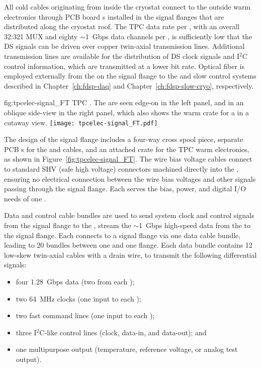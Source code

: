 All cold cables originating from inside the cryostat connect to the outside warm electronics through PCB board \fdth{}s
installed in the signal flanges that are distributed along the cryostat roof.
The TPC data rate per , with an overall \num{32}:\num{321} MUX and eighty $\sim$1~Gbps data channels per ,
is sufficiently low that the DS signals can be driven over copper twin-axial transmission lines.
Additional transmission lines are available for the distribution of DS clock signals and I$^2$C control information,
which are transmitted at a lower bit rate.
Optical fiber is employed externally from the  on the signal flange to the  and slow control systems described in Chapter~\ref{ch:fdsp-daq} and Chapter~\ref{ch:fdsp-slow-cryo}, respectively.

\begin{dunefigure}
{fig:tpcelec-signal_FT}
{TPC  \fdth. The  are seen edge-on in the left panel, and in an oblique side-view in the right panel, which also shows the warm crate for a  %
in a cutaway view.}
\texttt{[image: tpcelec-signal\_FT.pdf]}
\end{dunefigure}

The design of the signal flange includes a four-way cross spool piece, separate PCB \fdth{}s for the  and  cables, and
an attached crate for the TPC warm electronics, as shown in Figure~\ref{fig:tpcelec-signal_FT}.
The wire bias voltage cables connect to standard SHV (safe high voltage) connectors machined directly into the  \fdth,
ensuring no electrical connection between the wire bias voltages and other signals passing through the signal flange.
Each  \fdth serves the bias, power, and digital I/O needs of one .  

Data and control cable bundles are used to send system clock and control signals from the 
signal flange to the , stream the $\sim$\SI{1}{Gbps} high-speed data from the  to the signal flange.  Each  
connects to a signal flange via one data cable bundle, leading to 20 bundles between one  and one flange.  Each data bundle contains 12 low-skew twin-axial cables with a drain wire, 
to transmit the following differential signals:

\begin{itemize}
    \item four \SI{1.28}{Gbps} data (two from each );
    \item two \SI{64}{MHz} clocks (one input to each );
    \item two fast command lines (one input to each );
    \item three I$^2$C-like control lines (clock, data-in, and data-out); and
    \item one multipurpose  output (temperature, reference voltage, or analog test output).
\end{itemize}

